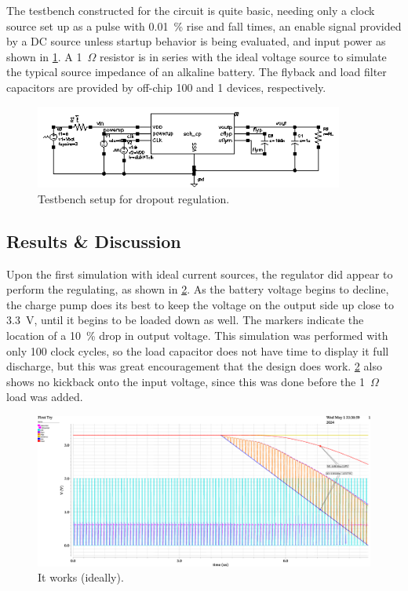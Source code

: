 \documentclass[11pt,letterpaper]{article}
\providecommand*{\upOmega}{\varOmega}   %
\begin{document}
The testbench constructed for the circuit is quite basic, needing only a clock source set up as a pulse with \qty{0.01}{\%} rise and fall times, an enable signal provided by a DC source unless startup behavior is being evaluated, and input power as shown in \cref{fig:tb}. A \qty{1}{\(\upOmega\)} resistor is in series with the ideal voltage source to simulate the typical source impedance of an alkaline battery. The flyback and load filter capacitors are provided by off-chip \qty{100}{\nF} and \qty{1}{\uF} devices, respectively.

\begin{figure}
    \centering
    \includegraphics[width=4in]{images/cp_tb.eps}
    \caption{Testbench setup for dropout regulation.}\label{fig:tb}
\end{figure}

\subsection {Results \& Discussion}

Upon the first simulation with ideal current sources, the regulator did appear to perform the regulating, as shown in \cref{fig:firsttry}. As the battery voltage begins to decline, the charge pump does its best to keep the voltage on the output side up close to \qty{3.3}{\V}, until it begins to be loaded down as well. The markers indicate the location of a \qty{10}{\%} drop in output voltage. This simulation was performed with only 100 clock cycles, so the load capacitor does not have time to display it full discharge, but this was great encouragement that the design does work. \cref{fig:firsttry} also shows no kickback onto the input voltage, since this was done before the \qty{1}{\(\upOmega\)} load was added.

\begin{figure}
    \centering
    \includegraphics[width=\textwidth]{images/first_try.eps}
    \caption{It works (ideally).}
    \label{fig:firsttry}
\end{figure}
\end{document}

